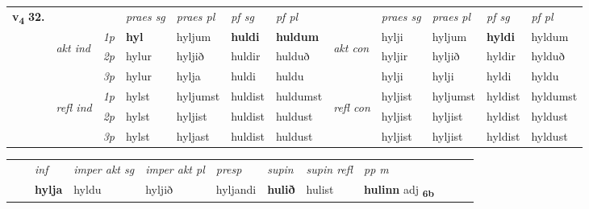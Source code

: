 \begin{tabular}{llllllllllll} \toprule
\multirow{4}{*}{{{\textbf{v{\textsubscript{4}}} \Large{\textbf{32.}}}}}  & &   &  \textit{praes sg}  & \textit{praes pl}  &\textit{ pf sg} & \textit{pf pl} &  &  \textit{praes sg}  & \textit{praes pl}  & \textit{pf sg} & \textit{pf pl } \\*
	\cmidrule{4-7} \cmidrule{9-12}
 & \multirow{3}{*}{\begin{turn}{90}\textit{akt ind}\end{turn}} & {\textit{1p}} & \textbf{hyl} & hyljum    & \textbf{huldi} & \textbf{huldum} & \multirow{3}{*}{\begin{turn}{90}\textit{akt con}\end{turn}} &hylji & hyljum & \textbf{hyldi} & hyldum\\*
& &  {\textit{2p}} &  hylur  & hyljið   & huldir & hulduð & & hyljir & hyljið & hyldir & hylduð \\*
& &  {\textit{3p}} & hylur & hylja   & huldi & huldu & & hylji & hylji& hyldi & hyldu  \\*
\cmidrule{4-7} \cmidrule{9-12}
 &\multirow{3}{*}{\begin{turn}{90}\textit{refl ind}\end{turn}} & {\textit{1p}} & hylst & hyljumst    & huldist & huldumst & \multirow{3}{*}{\begin{turn}{90}\textit{refl con}\end{turn}}  &hyljist & hyljumst & hyldist & hyldumst\\*
 &&  {\textit{2p}} &  hylst  & hyljist   & huldist & huldust & &hyljist & hyljist & hyldist & hyldust \\*
& &  {\textit{3p}} & hylst & hyljast   & huldist & huldust & & hyljist & hyljist& hyldist & hyldust  \\*
\cmidrule{4-7} \cmidrule{9-12}
\end{tabular}


\begin{tabular}{llllllllllll}
 & & \textit{inf} & \textit{imper akt sg} & \textit{imper akt pl}   & \textit{presp} & \textit{supin} & \textit{supin refl} & \textit{pp m}     \\*
  & & \textbf{hylja} & hyldu  & hyljið   & hyljandi &  \textbf{hulið} & hulist & \textbf{hulinn} adj \textbf{\textsubscript{6b}} \\*
\cmidrule{1-12}
\end{tabular}



